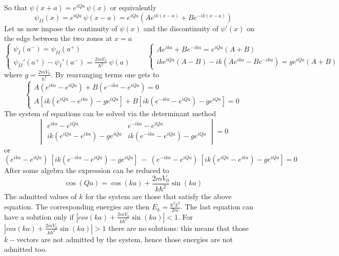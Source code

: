 \documentclass{article}
\begin{document}
So that 
$\psi(x+a) = e^{iQa} \, \psi(x)$ 
or equivalently 
\begin{equation}
    \psi_{II}(x) = e^{iQa} \, \psi(x-a) = e^{iQa} \left(Ae^{ik(x-a)} + Be^{-ik(x-a)}\right)
\end{equation}
Let us now impose the continuity of $\psi(x)$ and the discontinuity of $\psi'(x)$ on the edge between the two zones at $x=a$
$$\begin{cases}
    \psi_I(a^-) = \psi_{II}(a^+) \\
    \psi_{II}'(a^+) - \psi_{I}'(a^-) = \frac{2mV_0}{\hbar^2} \ \psi(a)
\end{cases}
\qquad
\begin{cases}
    Ae^{ika} + Be^{-ika} = e^{iQa} (A+B) \\
    ike^{iQa}(A-B) - ik(Ae^{ika} - Be^{-ika}) = ge^{iQa} (A+B)
\end{cases}
$$
where $g=\frac{2mV_0}{\hbar^2}$. By rearranging terms one gets to 
$$\begin{cases}
    A(e^{ika} - e^{iQa}) + B(e^{-ika} - e^{iQa}) = 0 \\
    A[ik(e^{iQa} - e^{ika}) - ge^{iQa}] + B[ik(e^{-ika} - e^{iQa}) - ge^{iQa}] = 0
\end{cases}$$
The system of equations can be solved via the determinant method 
\begin{equation*}
    \begin{vmatrix} e^{ika} - e^{iQa} & e^{-ika} - e^{iQa} \\ ik(e^{iQa} - e^{ika}) - ge^{iQa} & ik(e^{-ika} - e^{iQa}) - ge^{iQa} \end{vmatrix} = 0
\end{equation*} 
or
\begin{equation*}
    (e^{ika} - e^{iQa}) \ [ik(e^{-ika} - e^{iQa}) - ge^{iQa}] \ - \ (e^{-ika}-e^{iQa}) \ [ik(e^{iQa}-e^{ika})-ge^{iQa}] = 0
\end{equation*}
After some algebra the expression can be reduced to
\begin{equation}
    \cos(Qa) = \cos(ka) + \frac{2mV_0}{k\hbar^2} \sin(ka)
    \label{eq:trascendent_equation}
\end{equation}
The admitted values of $k$ for the system are those that satisfy the above equation. The corresponding energies are then $E_k = \frac{\hbar^2k^2}{2m}$.
The last equation can have a solution only if $|cos(ka) + \frac{2mV_0}{k\hbar^2} \sin(ka)| < 1$. 
For $|cos(ka) + \frac{2mV_0}{k\hbar^2} \sin(ka)| > 1$ there are no solutions: this means that those $k-$vectors are not admitted by the system, hence those energies are not admitted too.
\end{document}
